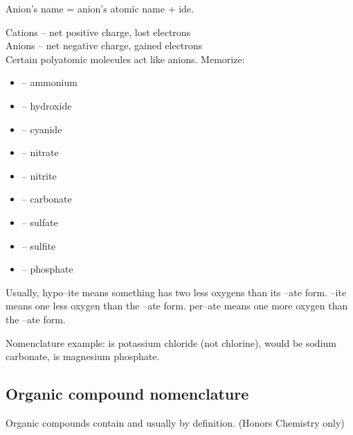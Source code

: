 \documentclass[letterpaper, 12pt]{article}
\begin{document}
	Anion's name = anion's atomic name + ide.

	Cations -- net positive charge, lost electrons\\
	Anions -- net negative charge, gained electrons\\

	Certain polyatomic molecules act like anions. Memorize:
	\begin{itemize}
		\item {} -- ammonium
		\item {} -- hydroxide
		\item {} -- cyanide
		\item {} -- nitrate
		\item {} -- nitrite
		\item {} -- carbonate
		\item {} -- sulfate
		\item {} -- sulfite
		\item {} -- phosphate
	\end{itemize}

	Usually, hypo--ite means something has two less oxygens than its --ate form. --ite means one less oxygen than the --ate form. per--ate means one more oxygen than the --ate form.

	Nomenclature example:  is potassium chloride (not chlorine),  would be sodium carbonate,  is magnesium phosphate.

	\subsection{Organic compound nomenclature}
	Organic compounds contain  and usually  by definition. (Honors Chemistry only)
\end{document}
